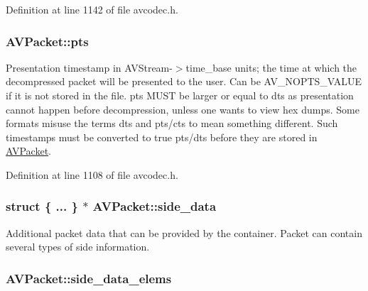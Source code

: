 Definition at line 1142 of file avcodec.\+h.

\subsubsection[{\texorpdfstring{pts}{pts}}]{ A\+V\+Packet\+::pts}\hypertarget{struct_a_v_packet_a73bde0a37f3b1efc839f11295bfbf42a}{}\label{struct_a_v_packet_a73bde0a37f3b1efc839f11295bfbf42a}
Presentation timestamp in A\+V\+Stream-\/$>$time\+\_\+base units; the time at which the decompressed packet will be presented to the user. Can be A\+V\+\_\+\+N\+O\+P\+T\+S\+\_\+\+V\+A\+L\+UE if it is not stored in the file. pts M\+U\+ST be larger or equal to dts as presentation cannot happen before decompression, unless one wants to view hex dumps. Some formats misuse the terms dts and pts/cts to mean something different. Such timestamps must be converted to true pts/dts before they are stored in \hyperlink{struct_a_v_packet}{A\+V\+Packet}. 

Definition at line 1108 of file avcodec.\+h.

\subsubsection[{\texorpdfstring{side\+\_\+data}{side_data}}]{\setlength{\rightskip}{0pt plus 5cm}struct \{ ... \}  $\ast$ A\+V\+Packet\+::side\+\_\+data}\hypertarget{struct_a_v_packet_afe42dfd3da47cb717a8183c9460436d2}{}\label{struct_a_v_packet_afe42dfd3da47cb717a8183c9460436d2}
Additional packet data that can be provided by the container. Packet can contain several types of side information. 
\subsubsection[{\texorpdfstring{side\+\_\+data\+\_\+elems}{side_data_elems}}]{ A\+V\+Packet\+::side\+\_\+data\+\_\+elems}\hypertarget{struct_a_v_packet_af415e25244b26921e8fc249d45499b84}{}\label{struct_a_v_packet_af415e25244b26921e8fc249d45499b84}


